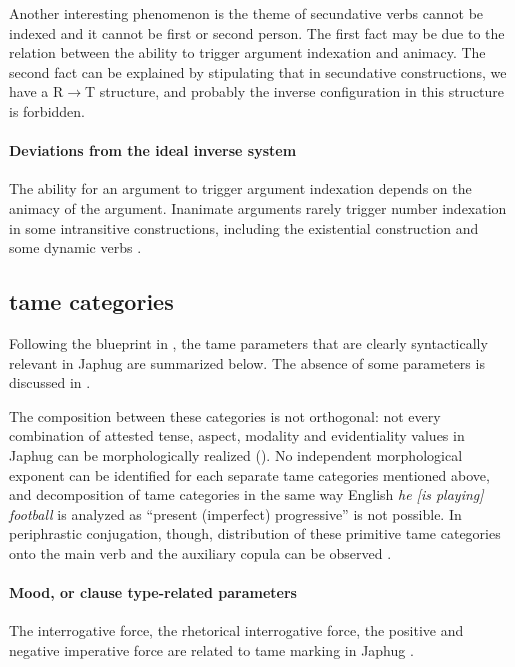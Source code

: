 \documentclass[a4paper, oneside, 12pt]{report}
\newcommand*{\textto}{$\to$}
\newcommand*{\citesec}[1]{\S~{#1}}
\newcommand*{\citepage}[1]{p.~{#1}}
\newcommand{\form}[1]{\emph{#1}}
\begin{document}
Another interesting phenomenon is the theme of secundative verbs
cannot be indexed and it cannot be first or second person.
The first fact may be due to the relation between the ability to trigger argument indexation and animacy.
The second fact can be explained by stipulating that in secundative constructions,
we have a R\textto T structure,
and probably the inverse configuration in this structure is forbidden. 

\paragraph*{Deviations from the ideal inverse system}
The ability for an argument to trigger argument indexation
depends on the animacy of the argument.
Inanimate arguments rarely trigger number indexation in some intransitive constructions,
including the existential construction and some dynamic verbs
\citep[\citesec{14.6.1.1}]{jacques2021grammar}.


\subsection{\ac{tame} categories}\label{sec:grammatical.clause.tame}

Following the blueprint in \citet{cinque1999adverbs},
the \ac{tame} parameters that are clearly syntactically relevant in Japhug
are summarized below.
The absence of some parameters is discussed in .

The composition between these categories is not orthogonal:
not every combination of attested tense, aspect, modality and evidentiality values in Japhug 
can be morphologically realized
().
No independent morphological exponent can be identified for 
each separate \acs{tame} categories mentioned above,
and decomposition of \acs{tame} categories 
in the same way English \form{he [is playing] football} 
is analyzed as ``present (imperfect) progressive'' is not possible. 
In periphrastic conjugation, though, 
distribution of these primitive \acs{tame} categories 
onto the main verb and the auxiliary copula 
can be observed \citep[\citepage{1089}, (7)]{jacques2021grammar}.


\paragraph*{Mood, or clause type-related parameters}
The interrogative force, the rhetorical interrogative force,
the positive and negative imperative force
are related to \ac{tame} marking in Japhug
\citep[\citesec{21.4}, \citesec{21.7.3}, \citesec{21.7.4}]{jacques2021grammar}.
\end{document}
